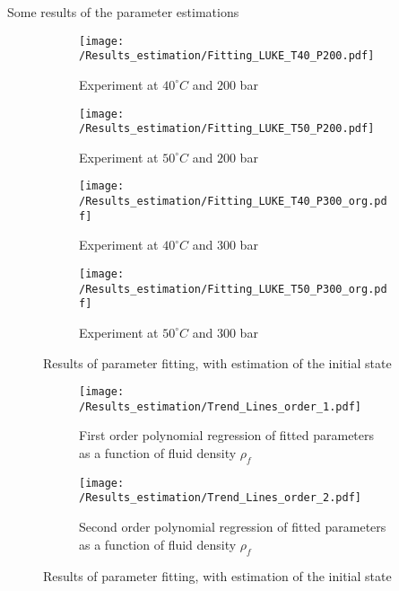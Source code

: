 \documentclass[../Article_Model_Parameters.tex]{subfiles}
\begin{document}
	
	\label{CH: Results}
	
	Some results of the parameter estimations

	\begin{figure*}
		\centering
		\begin{subfigure}[b]{0.7\textwidth}
			\centering
			\texttt{[image: /Results\_estimation/Fitting\_LUKE\_T40\_P200.pdf]}
			\caption{Experiment at $40^\circ C$ and $200$ bar}
		\end{subfigure}
		\hfill
		\begin{subfigure}[b]{0.7\textwidth}
			\centering
			\texttt{[image: /Results\_estimation/Fitting\_LUKE\_T50\_P200.pdf]}
			\caption{Experiment at $50^\circ C$ and $200$ bar}
		\end{subfigure}
		\hfill
		\begin{subfigure}[b]{0.7\textwidth}
			\centering
			\texttt{[image: /Results\_estimation/Fitting\_LUKE\_T40\_P300\_org.pdf]}
			\caption{Experiment at $40^\circ C$ and $300$ bar}
		\end{subfigure}
		\hfill
		\begin{subfigure}[b]{0.7\textwidth}
			\centering
			\texttt{[image: /Results\_estimation/Fitting\_LUKE\_T50\_P300\_org.pdf]}
			\caption{Experiment at $50^\circ C$ and $300$ bar}
		\end{subfigure}
		\caption{Results of parameter fitting, with estimation of the initial state}
	\end{figure*}

	\begin{figure*}
	\centering
	\begin{subfigure}[b]{0.85\textwidth}
		\centering
		\texttt{[image: /Results\_estimation/Trend\_Lines\_order\_1.pdf]}
		\caption{First order polynomial regression of fitted parameters as a function of fluid density $\rho_f$}
	\end{subfigure}
	\hfill
	\begin{subfigure}[b]{0.85\textwidth}
		\centering
		\texttt{[image: /Results\_estimation/Trend\_Lines\_order\_2.pdf]}
		\caption{Second order polynomial regression of fitted parameters as a function of fluid density $\rho_f$}
	\end{subfigure}
	\caption{Results of parameter fitting, with estimation of the initial state}
\end{figure*}
		
	
\end{document}
